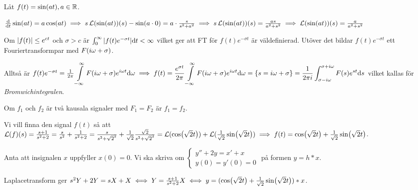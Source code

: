 \documentclass[a4paper]{article}
\begin{document}
\begin{ex}
    Låt \(
        f(t) = \sin(at), a \in \mathbb{R}
    \). 

    \(
        \dv{t} \sin(at) = a \cos(at)
            \implies s \operatorname{\mathcal{L}}(\sin(at))(s) - \sin(a\cdot 0) 
                = a \cdot \frac{s}{s^2+a^2} 
            \implies s \operatorname{\mathcal{L}}(\sin(at))(s) = \frac{as}{a^2+s^2}
            \implies \operatorname{\mathcal{L}}(\sin(at))(s) = \frac{a}{a^2+s^2} 
    \) 
\end{ex}

Om \(
    \abs{f(t)} \leq e^{ct} 
\) och \(
    \sigma > c
\) är \(
    \int_0^\infty \abs{f(t) e^{-\sigma t}} \dd t < \infty
\) vilket ger att FT för \(
    f(t) e^{-\sigma t}
\) är väldefinierad. Utöver det bildar \(
    f(t) e^{-\sigma t}
\) ett Fouriertransformpar med \(
    F(i\omega + \sigma)
\).

Alltså är \(
    f(t) e^{-\sigma t} = \frac{1}{2\pi} \displaystyle\int\limits_{-\infty}^{\infty} F(i\omega + \sigma) e^{i\omega t} \dd \omega
        \implies f(t) = \frac{ e^{\sigma t} }{2\pi} \displaystyle\int\limits_{-\infty}^{\infty} F(i\omega + \sigma) e^{i\omega t} \dd \omega
        = \{s = i\omega + \sigma\}
        = \frac{1}{2\pi i} \int_{\sigma-i\omega}^{\sigma+i\omega} F(s) e^{st} \dd s
\) vilket kallas för \emph{Bromwichintegralen}.

\begin{sats}
    Om \(
        f_1 
    \) och \(
        f_2
    \) är två kausala signaler med \(
        F_1 = F_2 
    \) är \(
        f_1 = f_2
    \).
\end{sats}

\begin{ex}
    Vi vill finna den signal \(
        f(t)
    \) så att \(
        \operatorname{\mathcal{L}}(f)(s) = \frac{s+1}{s^2+2} 
            = \frac{s}{s^2} + \frac{1}{s^2+2} 
            = \frac{s}{s^2+{\sqrt{2}}^2} + \frac{1}{\sqrt{2}} \frac{\sqrt{2}}{s^2 + {\sqrt{2}}^2}
            = \operatorname{\mathcal{L}}(\cos(\sqrt{2} t)) + \operatorname{\mathcal{L}}(\frac{1}{\sqrt{2}} \sin(\sqrt{2} t)) 
            \implies f(t) = \cos(\sqrt{2} t) + \frac{1}{\sqrt{2}} \sin(\sqrt{2} t)
    \).
\end{ex}

\begin{ex}
    Anta att insignalen \(
        x
    \) uppfyller \(
        x(0) = 0
    \). Vi ska skriva om \(
        \left\{\begin{matrix}
            y'' + 2y = x'+x \\ 
            y(0) = y'(0) = 0
        \end{matrix}\right.
    \) på formen \(
        y = h*x
    \).

    Laplacetransform ger \(
        s^2 Y + 2Y = sX + X
        \iff
        Y = \frac{s+1}{s^2+2} X
        \iff 
        y = (\cos(\sqrt{2} t) + \frac{1}{\sqrt{2}} \sin(\sqrt{2} t)) * x
    \).
\end{ex}
\end{document}
